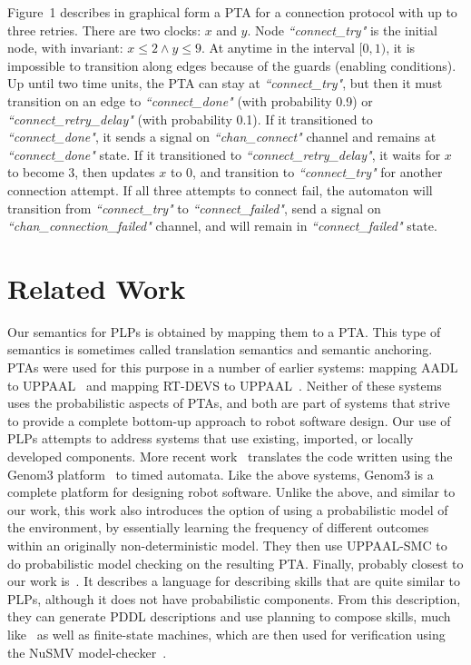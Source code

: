 \documentclass[letterpaper]{article}
\newcommand{\frameImage}[4]{
\begin{figure}[H]
  \centerline{
    \fcolorbox{frameColor}{white}{
        \texttt{[image: \#1]} } }
    \caption{#4}
    \label{fig:#1}
\end{figure}
}
\begin{document}
Figure~1 describes in graphical form a PTA for a connection protocol with up to three retries.
There are two clocks: $x$ and $y$. Node \textit{``connect\_try"} is the initial node, with invariant: $x\leq 2\wedge y \leq 9$. At anytime in the interval $\big[0,1\big)$, it is impossible to transition along edges because of the guards (enabling conditions). Up until two time units, the PTA can stay at \textit{``connect\_try"}, but then it must transition on an edge to \textit{``connect\_done"} (with probability 0.9) or \textit{``connect\_retry\_delay"} (with probability 0.1). If it transitioned to \textit{``connect\_done"}, it sends a signal on \textit{``chan\_connect"} channel and remains at \textit{``connect\_done"} state. If it transitioned to \textit{``connect\_retry\_delay"}, it waits for $x$ to become 3, then updates $x$ to 0, and transition to \textit{``connect\_try"} for another connection attempt. If all three attempts to connect fail, the automaton will transition from  \textit{``connect\_try"} to \textit{``connect\_failed"}, send a signal on \textit{``chan\_connection\_failed"} channel, and will remain in \textit{``connect\_failed"} state.





\section{Related Work}
Our semantics for PLPs is obtained by mapping them to a PTA. This type of semantics is sometimes called translation semantics and semantic anchoring. PTAs were used for this purpose in a number of earlier systems: mapping AADL to UPPAAL~\citep{JLPJ12} and mapping RT-DEVS to UPPAAL~\citep{FN08}. Neither of these systems uses the probabilistic aspects of PTAs, and both are part of systems that strive to provide a complete bottom-up approach to robot software design. Our use of PLPs attempts to address systems that use existing, imported, or locally developed components.
More recent work~\cite{FoughaliIS19} translates the code written using the Genom3 platform~\citep{Genom} to timed automata. Like the above systems, Genom3 is a complete platform for
designing robot software. Unlike the above, and similar to our work, this work also introduces the option of using
a probabilistic model of the environment, by essentially learning the frequency of different outcomes within an
originally non-deterministic model. They then use UPPAAL-SMC to do probabilistic
model checking on the resulting PTA. Finally, probably closest to our work is~\cite{Lesire20}.
It describes a language for describing skills that are quite similar to PLPs, although it does not have probabilistic components.
From this description, they can generate PDDL descriptions and use planning to compose skills, much like~\cite{PlanRob16} as well as finite-state machines, which  are then used for verification using the
NuSMV model-checker~\citep{NuSMV}.
\end{document}
